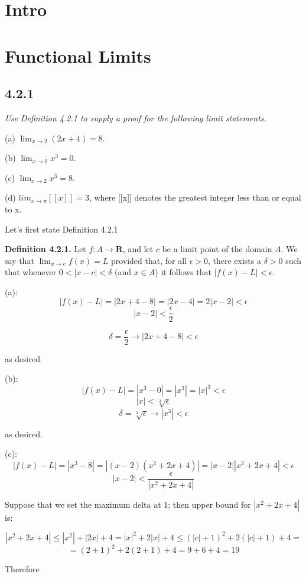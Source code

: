 \documentclass[11pt,oneside,titlepage]{book}
\begin{document}
\section{Intro}

\section{Functional Limits}

\subsection*{4.2.1}
\textit{Use Definition 4.2.1 to supply a proof for the following limit statements.}

(a) $\lim_{x \to 2}(2x + 4) = 8$.

(b) $\lim_{x\to0} x^3 = 0$.

(c) $\lim_{x\to2} x^3 = 8$.

(d) $lim_{x\to\pi}[[x]] = 3$, where [[x]] denotes the greatest integer less than or
equal to x.

Let's first state Definition 4.2.1

\textbf{Definition 4.2.1.} Let $f : A \to \textbf{R}$, and let $c$ be a limit
point of the domain $A$. We say that $\lim_{x\to c} f(x) = L$ provided
that, for all $\epsilon > 0$, there exists
a $\delta > 0$ such that whenever $0 < |x - c| < \delta$
(and $x \in A$) it follows that $|f(x) - L| < \epsilon$.

(a):
$$ |f(x) - L| = |2 x + 4 - 8| = |2 x - 4| = 2|x - 2| < \epsilon $$
$$ |x-2| < \frac{\epsilon}{2}$$

$$  \delta = \frac{\epsilon}{2} \to |2 x + 4 - 8| < \epsilon $$

as desired.

(b):
$$ |f(x) - L| = |x^3 - 0| = |x^3| = |x|^3 < \epsilon $$
$$ |x| < \sqrt[3]{\epsilon}{} $$
$$ \delta = \sqrt[3]{\epsilon} \to |x^3| < \epsilon $$

as desired.

(c):
$$ |f(x) - L| = |x^3 - 8| = |(x - 2)(x^2 + 2x + 4)| = |x-2||x^2 + 2x + 4| < \epsilon $$
$$|x-2| < \frac{\epsilon}{|x^2 + 2x + 4|} $$

Suppose that we set the maximum delta at 1; then upper bound for $|x^2 + 2x + 4|$ is:

$$ |x^2 + 2x + 4| \leq |x^2| + |2x| + 4 = |x|^2 + 2|x| + 4 \leq (|c| + 1)^2 + 2(|c| + 1) + 4 =$$
$$= (2 + 1)^2 + 2(2 + 1) + 4 = 9 + 6 + 4 = 19
$$

Therefore
\end{document}
